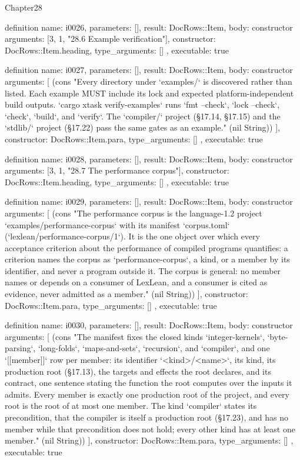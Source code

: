 \begin{lexlean}{Chapter28}
\begin{semanticmodule}
definition{
  name: i0026,
  parameters: [],
  result: DocRows::Item,
  body: constructor{
    arguments: [3, 1, "28.6 Example verification"],
    constructor: DocRows::Item.heading,
    type_arguments: []
  },
  executable: true
}

definition{
  name: i0027,
  parameters: [],
  result: DocRows::Item,
  body: constructor{
    arguments: [
      (cons "Every directory under `examples/` is discovered rather than listed. Each example MUST include its lock and expected platform-independent build outputs. `cargo xtask verify-examples` runs `fmt --check`, `lock --check`, `check`, `build`, and `verify`. The `compiler/` project (§17.14, §17.15) and the `stdlib/` project (§17.22) pass the same gates as an example." (nil String))
    ],
    constructor: DocRows::Item.para,
    type_arguments: []
  },
  executable: true
}

definition{
  name: i0028,
  parameters: [],
  result: DocRows::Item,
  body: constructor{
    arguments: [3, 1, "28.7 The performance corpus"],
    constructor: DocRows::Item.heading,
    type_arguments: []
  },
  executable: true
}

definition{
  name: i0029,
  parameters: [],
  result: DocRows::Item,
  body: constructor{
    arguments: [
      (cons "The performance corpus is the language-1.2 project `examples/performance-corpus` with its manifest `corpus.toml` (`lexlean/performance-corpus/1`). It is the one object over which every acceptance criterion about the performance of compiled programs quantifies: a criterion names the corpus as `performance-corpus`, a kind, or a member by its identifier, and never a program outside it. The corpus is general: no member names or depends on a consumer of LexLean, and a consumer is cited as evidence, never admitted as a member." (nil String))
    ],
    constructor: DocRows::Item.para,
    type_arguments: []
  },
  executable: true
}

definition{
  name: i0030,
  parameters: [],
  result: DocRows::Item,
  body: constructor{
    arguments: [
      (cons "The manifest fixes the closed kinds `integer-kernels`, `byte-parsing`, `long-folds`, `maps-and-sets`, `recursion`, and `compiler`, and one `[[member]]` row per member: its identifier `<kind>/<name>`, its kind, its production root (§17.13), the targets and effects the root declares, and its contract, one sentence stating the function the root computes over the inputs it admits. Every member is exactly one production root of the project, and every root is the root of at most one member. The kind `compiler` states its precondition, that the compiler is itself a production root (§17.23), and has no member while that precondition does not hold; every other kind has at least one member." (nil String))
    ],
    constructor: DocRows::Item.para,
    type_arguments: []
  },
  executable: true
}


\end{semanticmodule}
\end{lexlean}
